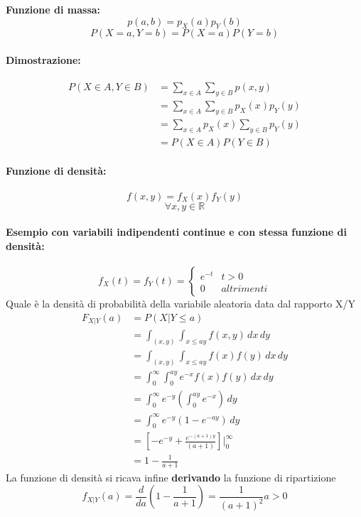 \documentclass[]{article}
\begin{document}
    \textbf{Funzione di massa:}
    \[ p(a,b) = p_X(a) p_Y(b) \]
    \[ P(X=a, Y=b) = P(X=a) P(Y=b)\]
    \paragraph{Dimostrazione:}
    \begin{equation*}
        \begin{split}
            P(X \in A, Y \in B) & = \sum_{x \in A}^{} \sum_{y \in B}^{} p(x, y) \\
            & = \sum_{x \in A}^{} \sum_{y \in B}^{} p_X(x) p_Y(y) \\
            & = \sum_{x \in A}^{} p_X(x) \sum_{y \in B}^{} p_Y(y) \\
            & = P(X \in A) P(Y \in B)
        \end{split}
    \end{equation*}

    \paragraph{Funzione di densità:}
    \[ f(x, y) = f_X(x) f_Y(y)\]
    \[ \forall x,y \in \mathbb{R} \]
    
    \paragraph{Esempio con variabili indipendenti continue e con stessa funzione di densità:}
    \begin{equation*}
        f_X(t) = f_Y(t) =
        \begin{cases}
            e^{-t} & t > 0 \\
            0 & altrimenti
        \end{cases}
    \end{equation*}
    Quale è la densità di probabilità della variabile aleatoria data dal rapporto X/Y
    \begin{equation*}
    \begin{split}
        F_{X|Y}(a) & = P(X | Y \leq a) \\
        & = \int_{(x,y)}^{}\int_{x \leq ay}^{} f(x, y) \, dx \, dy \\ 
        & = \int_{(x,y)}^{}\int_{x \leq ay}^{} f(x) f(y) \, dx \, dy \\ 
        & = \int_{0}^{\infty} \int_{0}^{ay} e^{-x} f(x) f(y)\, dx \, dy \\ 
        & = \int_{0}^{\infty} e^{-y}(\int_{0}^{ay} e^{-x}) \, dy \\
        & = \int_{0}^{\infty} e^{-y} (1-e^{-ay}) \, dy \\ 
        & = [-e^{-y} + \frac{e^{-(a+1)y}}{(a+1)}] \bigg\rvert_{0}^{\infty} \\ 
        & =  1 - \frac{1}{a+1} 
    \end{split}
    \end{equation*}
    La funzione di densità si ricava infine \textbf{derivando} la funzione di ripartizione
    \[f_{X|Y}(a) = \frac{d}{da}(1- \frac{1}{a + 1}) = \frac{1}{(a + 1)^2} a > 0 \]
\end{document}
